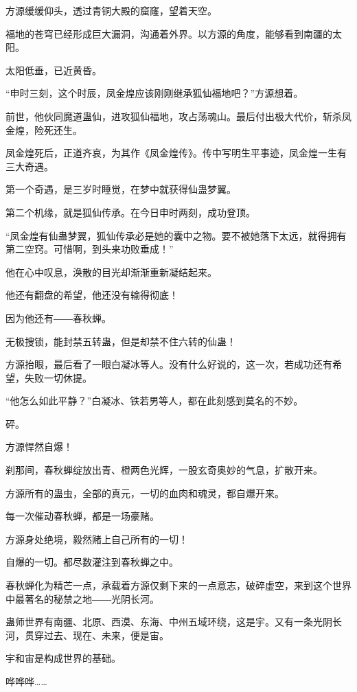
\begin{this_body}

方源缓缓仰头，透过青铜大殿的窟窿，望着天空。

福地的苍穹已经形成巨大漏洞，沟通着外界。以方源的角度，能够看到南疆的太阳。

太阳低垂，已近黄昏。

“申时三刻，这个时辰，凤金煌应该刚刚继承狐仙福地吧？”方源想着。

前世，他伙同魔道蛊仙，进攻狐仙福地，攻占荡魂山。最后付出极大代价，斩杀凤金煌，险死还生。

凤金煌死后，正道齐哀，为其作《凤金煌传》。传中写明生平事迹，凤金煌一生有三大奇遇。

第一个奇遇，是三岁时睡觉，在梦中就获得仙蛊梦翼。

第二个机缘，就是狐仙传承。在今日申时两刻，成功登顶。

“凤金煌有仙蛊梦翼，狐仙传承必是她的囊中之物。要不被她落下太远，就得拥有第二空窍。可惜啊，到头来功败垂成！”

他在心中叹息，涣散的目光却渐渐重新凝结起来。

他还有翻盘的希望，他还没有输得彻底！

因为他还有――春秋蝉。

无极搜锁，能封禁五转蛊，但是却禁不住六转的仙蛊！

方源抬眼，最后看了一眼白凝冰等人。没有什么好说的，这一次，若成功还有希望，失败一切休提。

“他怎么如此平静？”白凝冰、铁若男等人，都在此刻感到莫名的不妙。

砰。

方源悍然自爆！

刹那间，春秋蝉绽放出青、橙两色光辉，一股玄奇奥妙的气息，扩散开来。

方源所有的蛊虫，全部的真元，一切的血肉和魂灵，都自爆开来。

每一次催动春秋蝉，都是一场豪赌。

方源身处绝境，毅然赌上自己所有的一切！

自爆的一切。都尽数灌注到春秋蝉之中。

春秋蝉化为精芒一点，承载着方源仅剩下来的一点意志，破碎虚空，来到这个世界中最著名的秘禁之地――光阴长河。

蛊师世界有南疆、北原、西漠、东海、中州五域环绕，这是宇。又有一条光阴长河，贯穿过去、现在、未来，便是宙。

宇和宙是构成世界的基础。

哗哗哗……


\end{this_body}

